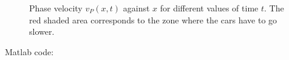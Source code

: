 \begin{questions}
\begin{solution}
\begin{figure}[H]\label{fig:p3_vp}
\centering     %
{}
\hspace{-0.9cm}
\hspace{-0.9cm}
\hspace{-0.9cm}
\hspace{-0.9cm}
\hspace{-0.9cm}
\hspace{-0.9cm}
\caption{Phase velocity $v_P(x,t)$ against $x$ for different values of time $t$. The red shaded area corresponds to the zone where the cars have to go slower.} 
\end{figure}

Matlab code:

\end{solution}
\end{questions}